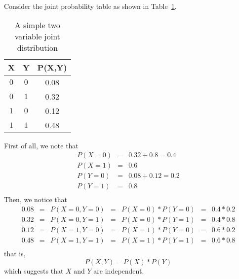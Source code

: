 \begin{example}\label{example:independenceexample}
Consider the joint probability table as shown in Table~\ref{tab:simpleJointProbability}. 
\begin{table}[!htbp]
    \centering
    \begin{tabular}{|c|c|c|}
    \hline
        X & Y & P(X,Y)  \\
        \hline
        $0$  &  $0$ & 0.08 \\
        $0$  &  $1$ & 0.32 \\
        $1$  &  $0$ & 0.12 \\
        $1$  &  $1$ & 0.48 \\
        \hline
    \end{tabular}
    \caption{A simple two variable joint distribution}
    \label{tab:simpleJointProbability}
\end{table}

First of all, we note that 
\begin{equation}
    \begin{array}{lcl}
        P(X=0) & = & 0.32+0.8 = 0.4 \\
        P(X=1) & = & 0.6 \\
        P(Y=0) & = & 0.08+0.12 = 0.2 \\
        P(Y=1) & = & 0.8 \\
    \end{array}
\end{equation}
Then, we notice that 
\begin{equation}
    \begin{array}{lclclcl}
      0.08 & = &  P(X=0,Y=0) & = & P(X=0)*P(Y=0) & = & 0.4 * 0.2 \\
      0.32 & = &  P(X=0,Y=1) & = & P(X=0)*P(Y=1) & = & 0.4 * 0.8 \\
      0.12 & = &  P(X=1,Y=0) & = & P(X=1)*P(Y=0) & = & 0.6 * 0.2 \\
      0.48 & = &  P(X=1,Y=1) & = & P(X=1)*P(Y=1) & = & 0.6 * 0.8 \\
    \end{array}
\end{equation}
that is, 
\begin{equation}
    P(X,Y) = P(X) * P(Y)
\end{equation}
which suggests that $X$ and $Y$ are independent.
\end{example}

